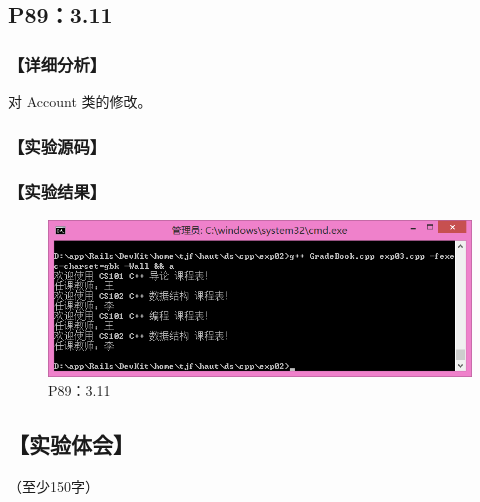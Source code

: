 \subsection{P89：3.11}
\subsubsection*{【详细分析】}
对 Account 类的修改。
\subsubsection*{【实验源码】}
{\linespread{1}}
{\linespread{1}}
{\linespread{1}}
\subsubsection*{【实验结果】}
\begin{figure}[htp]
\centering
\includegraphics[width=\textwidth]{exp02/exp03.png}
\caption{\label{out02_03}P89：3.11}
\end{figure}

\subsection*{【实验体会】}
（至少150字）
